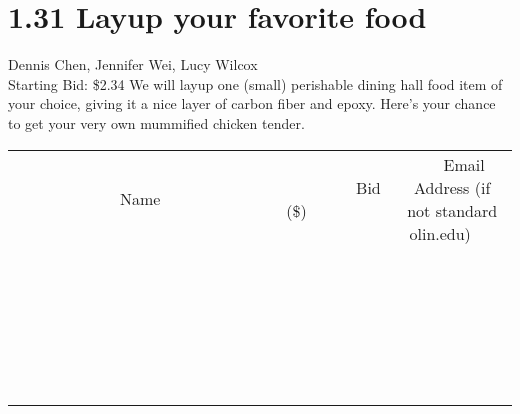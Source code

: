 \documentclass[11pt]{article}
\begin{document}
\section*{1.31 Layup your favorite food}
Dennis Chen, Jennifer Wei, Lucy Wilcox
\\
Starting Bid: \$2.34
\newline
We will layup one (small) perishable dining hall food item of your choice, giving it a nice layer of carbon fiber and epoxy. Here's your chance to get your very own mummified chicken tender.
\\[6ex]
\begin{tabular}{c c c}
~~~~~~~~~~~~~Name~~~~~~~~~~~~~ & ~~~~~~~~~Bid (\$)~~~~~~~~~  & ~~~Email Address (if not standard olin.edu)~~~\\
 & & \\
\hline
 & & \\
\hline
 & & \\
\hline
 & & \\
\hline
 & & \\
\hline
 & & \\
\hline
 & & \\
\hline
 & & \\
\hline
 & & \\
\hline
 & & \\
\hline
 & & \\
\hline
 & & \\
\hline
 & & \\
\hline
 & & \\
\hline
 & & \\
\hline
 & & \\
\hline
 & & \\
\hline
 & & \\
\hline
 & & \\
\hline
 & & \\
\hline
 & & \\
\hline
 & & \\
\hline
 & & \\
\hline
 & & \\
\hline
 & & \\
\hline
 & & \\
\hline
\end{tabular}
\newpage
\end{document}

